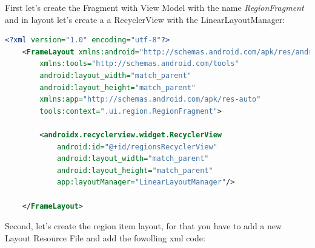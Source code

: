\documentclass[a4paper, 12pt]{article}
\begin{document}
First let's create the Fragment with View Model with the name \textit{RegionFragment} and in layout let's create a a RecyclerView with the LinearLayoutManager:

\begin{lstlisting}[caption={Region Fragment Layout.}, label={code:screen_region_list}, language=XML]
    <?xml version="1.0" encoding="utf-8"?>
    <FrameLayout xmlns:android="http://schemas.android.com/apk/res/android"
        xmlns:tools="http://schemas.android.com/tools"
        android:layout_width="match_parent"
        android:layout_height="match_parent"
        xmlns:app="http://schemas.android.com/apk/res-auto"
        tools:context=".ui.region.RegionFragment">
    
        <androidx.recyclerview.widget.RecyclerView
            android:id="@+id/regionsRecyclerView"
            android:layout_width="match_parent"
            android:layout_height="match_parent"
            app:layoutManager="LinearLayoutManager"/>
    
    </FrameLayout>
\end{lstlisting}

Second, let's create the region item layout, for that you have to add a new Layout Resource File and add the fowolling xml code:
\end{document}
